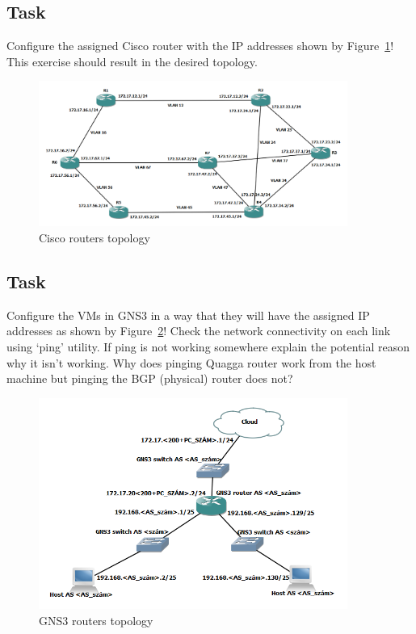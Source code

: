 \documentclass[a4paper]{article}
\begin{document}
\subsection{Task}
Configure the assigned Cisco router with the IP addresses shown by Figure~\ref{fig:cisco-topo}! This exercise should
result in the desired topology.

\begin{figure}[H]
    \centering
    \includegraphics[width=0.9\textwidth]{figures/cisco_router_topology.png}
    \caption{Cisco routers topology}
    \label{fig:cisco-topo}
\end{figure}

\subsection{Task}

Configure the VMs in GNS3 in a way that they will have the assigned IP addresses as shown by
Figure~\ref{fig:gns3-topo}! Check the network connectivity on each link using `ping' utility. If ping is not working
somewhere explain the potential reason why it isn't working. Why does pinging Quagga router work from the host machine
but pinging the BGP (physical) router does not?

\begin{figure}[H]
    \centering
    \includegraphics[width=0.9\textwidth]{figures/gns3_topology.png}
    \caption{GNS3 routers topology}
    \label{fig:gns3-topo}
\end{figure}
\end{document}
